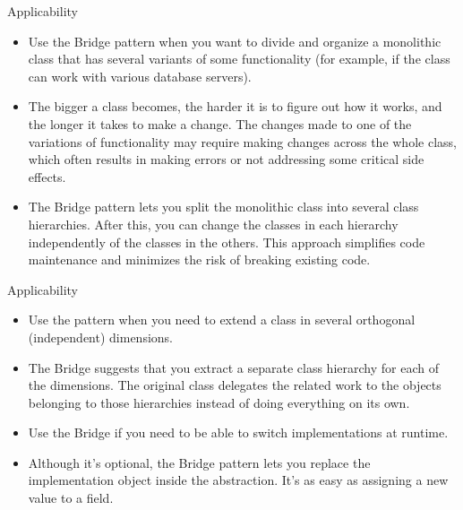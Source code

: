 \documentclass[13pt]{beamer}
\begin{document}
\begin{frame}{Applicability}
	\textcolor{blue}{}
	\begin{itemize}
		\item Use the Bridge pattern when you want to divide and organize a monolithic class that has several variants of some functionality (for example, if the class can work with various database servers).
		\item The bigger a class becomes, the harder it is to figure out how it works, and the longer it takes to make a change. The changes made to one of the variations of functionality may require making changes across the whole class, which often results in making errors or not addressing some critical side effects.
		\item The Bridge pattern lets you split the monolithic class into several class hierarchies. After this, you can change the classes in each hierarchy independently of the classes in the others. This approach simplifies code maintenance and minimizes the risk of breaking existing code.
	\end{itemize}
\end{frame}

\begin{frame}{Applicability}
	\textcolor{blue}{}
	\begin{itemize}
		\item Use the pattern when you need to extend a class in several orthogonal (independent) dimensions.
		\item The Bridge suggests that you extract a separate class hierarchy for each of the dimensions. The original class delegates the related work to the objects belonging to those hierarchies instead of doing everything on its own.
		\item Use the Bridge if you need to be able to switch implementations at runtime.
		\item Although it’s optional, the Bridge pattern lets you replace the implementation object inside the abstraction. It’s as easy as assigning a new value to a field.
	\end{itemize}
\end{frame}
\end{document}
